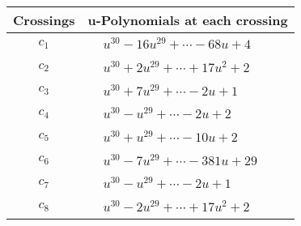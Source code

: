 \documentclass[1p]{elsarticle_modified}
\theoremstyle{definition}
\begin{document}
\begin{tabular}{m{50pt}|m{274pt}}
Crossings & \hspace{64pt}u-Polynomials at each crossing \\
\hline $$\begin{aligned}c_{1}\end{aligned}$$&$\begin{aligned}
&u^{30}-16 u^{29}+\cdots-68 u+4
\end{aligned}$\\
\hline $$\begin{aligned}c_{2}\end{aligned}$$&$\begin{aligned}
&u^{30}+2 u^{29}+\cdots+17 u^2+2
\end{aligned}$\\
\hline $$\begin{aligned}c_{3}\end{aligned}$$&$\begin{aligned}
&u^{30}+7 u^{29}+\cdots-2 u+1
\end{aligned}$\\
\hline $$\begin{aligned}c_{4}\end{aligned}$$&$\begin{aligned}
&u^{30}- u^{29}+\cdots-2 u+2
\end{aligned}$\\
\hline $$\begin{aligned}c_{5}\end{aligned}$$&$\begin{aligned}
&u^{30}+u^{29}+\cdots-10 u+2
\end{aligned}$\\
\hline $$\begin{aligned}c_{6}\end{aligned}$$&$\begin{aligned}
&u^{30}-7 u^{29}+\cdots-381 u+29
\end{aligned}$\\
\hline $$\begin{aligned}c_{7}\end{aligned}$$&$\begin{aligned}
&u^{30}- u^{29}+\cdots-2 u+1
\end{aligned}$\\
\hline $$\begin{aligned}c_{8}\end{aligned}$$&$\begin{aligned}
&u^{30}-2 u^{29}+\cdots+17 u^2+2
\end{aligned}$\\

\end{tabular}
\end{document}
